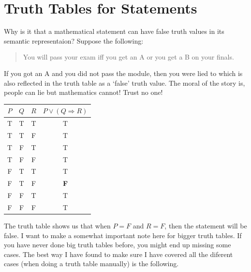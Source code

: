 \section{Truth Tables for Statements}
Why is it that a mathematical statement can have false truth values in its semantic representaion?\newline
Suppose the following: 
\begin{quote}
    You will pass your exam iff you get an A or you get a B on your finals.
\end{quote}
If you got an A and you did not pass the module, then you were lied to which is also reflected in the truth table as a `false' truth value. The moral of the story is, people can lie but mathematics cannot! Trust no one!
\begin{table}[H]
    \centering
    \begin{tabular}{cccc}
        \toprule
        $P$ & $Q$ & $R$ & $P\lor(Q\Rightarrow R)$\\
        \midrule
        T & T & T & T \\
        
        T & T & F & T\\
        
        T & F & T & T\\
        
        T & F & F & T\\
        
        F & T & T & T\\
        
        F & T & F & \textbf{F}\\
        
        F & F & T & T\\
        
        F & F & F & T\\
        \bottomrule
    \end{tabular}
\end{table}
The truth table shows us that when $P=F$ and $R=F$, then the statement will be false.\newline
I want to make a somewhat important note here for bigger truth tables. If you have never done big truth tables before, you might end up missing some cases. The best way I have found to make sure I have covered all the diferent cases (when doing a truth table manually) is the following. 
